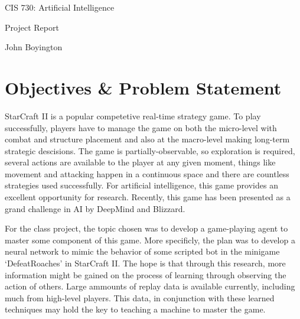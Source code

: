\documentclass{amsart}
\theoremstyle{definition}
\begin{document}
\LARGE{CIS 730: Artificial Intelligence}
 
\large
Project Report
 
John Boyington
\newline
\bigskip









\section{Objectives \& Problem Statement}


StarCraft II is a popular competetive real-time strategy game.
To play successfully, players have to manage the game on both the micro-level with combat and structure placement and also at the macro-level making long-term strategic descisions.
The game is partially-observable, so exploration is required, several actions are available to the player at any given moment, things like movement and attacking happen in a continuous space and there are countless strategies used successfully.
For artificial intelligence, this game provides an excellent opportunity for research.
Recently, this game has been presented as a grand challenge in AI by DeepMind and Blizzard.

For the class project, the topic chosen was to develop a game-playing agent to master some component of this game.
More specificly, the plan was to develop a neural network to mimic the behavior of some scripted bot in the minigame `DefeatRoaches' in StarCraft II.
The hope is that through this research, more information might be gained on the process of learning through observing the action of others.
Large ammounts of replay data is available currently, including much from high-level players.
This data, in conjunction with these learned techniques may hold the key to teaching a machine to master the game.
\end{document}
